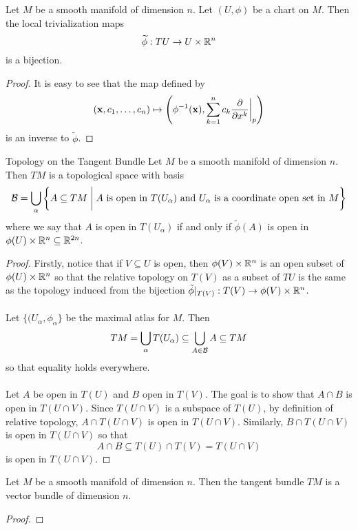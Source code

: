 \documentclass[a4paper]{article}
\begin{document}
\begin{lmm}{}{} Let $M$ be a smooth manifold of dimension $n$. Let $(U,\phi)$ be a chart on $M$. Then the local trivialization maps $$\widetilde{\phi}:TU\to U\times\mathbb{R}^n$$ is a bijection. \tcbline
\begin{proof}
It is easy to see that the map defined by $$(\vb{x},c_1,\dots,c_n)\mapsto\left(\phi^{-1}(\vb{x}),\sum_{k=1}^nc_k\frac{\partial}{\partial x^k}\bigg{|}_p\right)$$ is an inverse to $\tilde{\phi}$. 
\end{proof}
\end{lmm}

\begin{thm}{Topology on the Tangent Bundle}{} Let $M$ be a smooth manifold of dimension $n$. Then $TM$ is a topological space with basis $$\mathcal{B}=\bigcup_{\alpha}\left\{A\subseteq TM\;\bigg{|}\;A\text{ is open in } T(U_\alpha)\text{ and } U_\alpha\text{ is a coordinate open set in }M\right\}$$ where we say that $A$ is open in $T(U_\alpha)$ if and only if $\tilde{\phi}(A)$ is open in $\phi(U)\times\mathbb{R}^n\subseteq\mathbb{R}^{2n}$. \tcbline
\begin{proof}
Firstly, notice that if $V\subseteq U$ is open, then $\phi(V)\times\mathbb{R}^n$ is an open subset of $\phi(U)\times\mathbb{R}^n$ so that the relative topology on $T(V)$ as a subset of $TU$ is the same as the topology induced from the bijection $\tilde{\phi}|_{T(V)}:T(V)\to\phi(V)\times\mathbb{R}^n$. \\~\\

Let $\{(U_\alpha,\phi_\alpha\}$ be the maximal atlas for $M$. Then $$TM=\bigcup_{\alpha}T(U_\alpha)\subseteq\bigcup_{A\in\mathcal{B}}A\subseteq TM$$ so that equality holds everywhere. \\~\\

Let $A$ be open in $T(U)$ and $B$ open in $T(V)$. The goal is to show that $A\cap B$ is open in $T(U\cap V)$. Since $T(U\cap V)$ is a subspace of $T(U)$, by definition of relative topology, $A\cap T(U\cap V)$ is open in $T(U\cap V)$. Similarly, $B\cap T(U\cap V)$ is open in $T(U\cap V)$ so that $$A\cap B\subseteq T(U)\cap T(V)=T(U\cap V)$$ is open in $T(U\cap V)$. 
\end{proof}
\end{thm}

\begin{prp}{}{} Let $M$ be a smooth manifold of dimension $n$. Then the tangent bundle $TM$ is a vector bundle of dimension $n$. \tcbline
\begin{proof}

\end{proof}
\end{prp}
\end{document}
